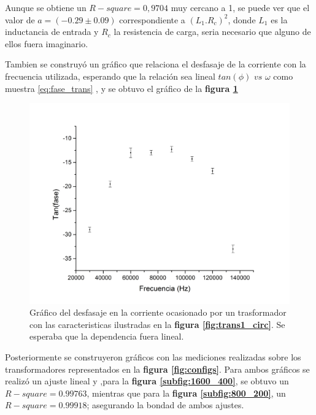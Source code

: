 \documentclass[11pt,a4paper]{article}
\begin{document}
Aunque se obtiene un $R-square = 0,9704$ muy cercano a 1, se puede ver que el valor de $a= (-0.29 \pm 0.09)$ correspondiente a $(L_{1}.R_{c})^2$, donde $L_{1}$ es la inductancia de entrada y $R_{c}$ la resistencia de carga, seria necesario que alguno de ellos fuera imaginario.

Tambien se construyó un gráfico que relaciona el desfasaje de la corriente con la frecuencia utilizada, esperando que la relación sea lineal $tan(\phi)$ $vs$ $\omega$ como muestra \eqref{eq:fase_trans} , y se obtuvo el gráfico de la \textbf{figura \ref{fig:Tr1-Des}}

\begin{figure}[H]
	\centering
	\includegraphics[scale=0.4]{Desfasaje_vs_frecuencia}
	\caption{Gráfico del desfasaje en la corriente ocasionado por un trasformador con las caracteristicas ilustradas en la \textbf{figura \ref{fig:trans1_circ}}. Se esperaba que la dependencia fuera lineal.}
	\label{fig:Tr1-Des}
\end{figure}

Posteriormente se construyeron gráficos con las mediciones realizadas sobre los transformadores representados en la \textbf{figura \ref{fig:configs}}.
Para ambos gráficos se realizó un ajuste lineal y ,para la \textbf{figura \ref{subfig:1600_400}}, se obtuvo un $R-square = 0.99763$, mientras que para la \textbf{figura \ref{subfig:800_200}}, un $R-square = 0.99918$; asegurando la bondad de ambos ajustes.
\end{document}
